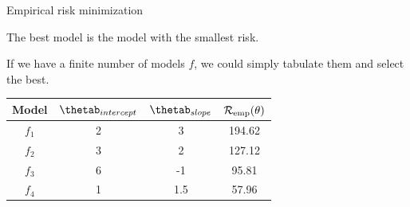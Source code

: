 \documentclass[11pt,compress,t,notes=noshow, xcolor=table]{beamer}
\begin{document}
\begin{vbframe}{Empirical risk minimization}

The best model is the model with the smallest risk. 

\lz

If we have a finite number of models $f$, we could simply tabulate them
and select the best.


\begin{center}
\begin{tabular}{ c | c | c || c }
 Model & \(\displaystyle \thetab_{intercept} \) & \(\displaystyle \thetab_{slope} \) & \(\displaystyle \mathcal{R}_{\text{emp}}(\theta) \) \\ 
 \hline
\(\displaystyle f_1 \)   & 2 & 3 & 194.62 \\
\(\displaystyle f_2 \)   & 3 & 2 & 127.12 \\  
\(\displaystyle f_3 \)   & 6 & -1 & 95.81 \\
\rowcolor{lightgray}
\(\displaystyle f_4 \)   & 1 & 1.5 & 57.96 \\  
\end{tabular}
\end{center}


\end{vbframe}
\end{document}
